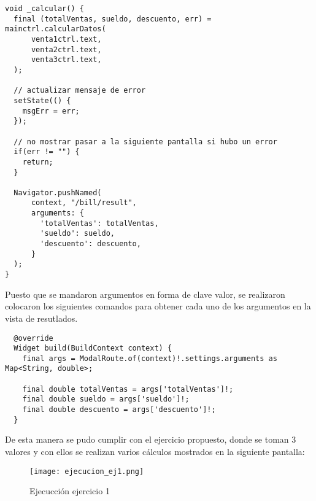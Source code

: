 \begin{center}
\begin{lstlisting}
void _calcular() {
  final (totalVentas, sueldo, descuento, err) = mainctrl.calcularDatos(
      venta1ctrl.text,
      venta2ctrl.text,
      venta3ctrl.text,
  );

  // actualizar mensaje de error
  setState(() {
    msgErr = err;
  });

  // no mostrar pasar a la siguiente pantalla si hubo un error
  if(err != "") {
    return;
  }

  Navigator.pushNamed(
      context, "/bill/result",
      arguments: {
        'totalVentas': totalVentas,
        'sueldo': sueldo,
        'descuento': descuento,
      }
  );
}
\end{lstlisting}
\end{center}

Puesto que se mandaron argumentos en forma de clave valor, se realizaron colocaron los siguientes comandos para obtener cada uno de los argumentos en la vista de resutlados.

\begin{center}
\begin{lstlisting}
  @override
  Widget build(BuildContext context) {
    final args = ModalRoute.of(context)!.settings.arguments as Map<String, double>;

    final double totalVentas = args['totalVentas']!;
    final double sueldo = args['sueldo']!;
    final double descuento = args['descuento']!;
  }
\end{lstlisting}
\end{center}

De esta manera se pudo cumplir con el ejercicio propuesto, donde se toman 3 valores y con ellos se realizan varios cálculos mostrados en la siguiente pantalla:

\begin{figure}[H]
    \centering
    \texttt{[image: ejecucion\_ej1.png]}
    \caption{Ejecucción ejercicio 1}
    \label{fig:ej1_ejecuccion}
\end{figure}
